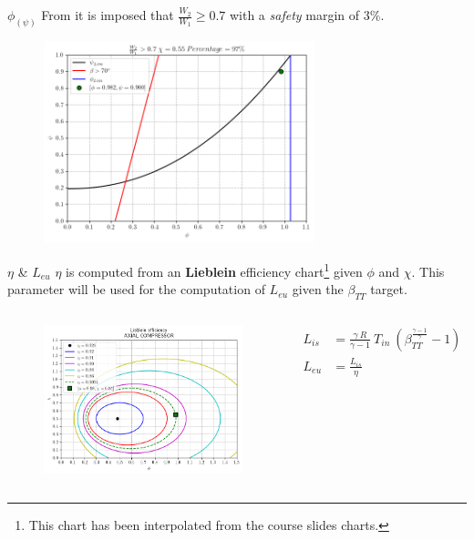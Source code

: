 	\begin{frame}{$\phi_{(\psi)}$}
		From \cite[Sec. 10.4]{axial2004} it is imposed that $\frac{W_2}{W_1} \geq 0.7$ with a \textit{safety} margin of $3 \%$.  
		\begin{figure}
			\centering
			\includegraphics[width=0.7\textwidth]{figures/stagePerf.png}
		\end{figure}
	\end{frame}
	\begin{frame}{$\eta$ \& $L_{eu}$}
		$\eta$ is computed from an \textbf{Lieblein} efficiency chart\footnote{This chart has been interpolated from the course slides charts.} given $\phi$ and $\chi$. This parameter will be used for the computation of $L_{eu}$ given the $\beta_{TT}$ target.
		\begin{columns}
				\begin{figure}
					\centering 
					\includegraphics[width=1\textwidth]{figures/efficiency.png}
				\end{figure}
			\begin{align}
				L_{is} & = \frac{\gamma \ R}{\gamma - 1} \ T_{in} \ (\beta_{TT}^{{\frac{\gamma - 1}{\gamma}}} - 1) \nonumber \\
				L_{eu} & = \frac{L_{is}}{\eta} \nonumber
			\end{align}
		\end{columns}
	\end{frame}
